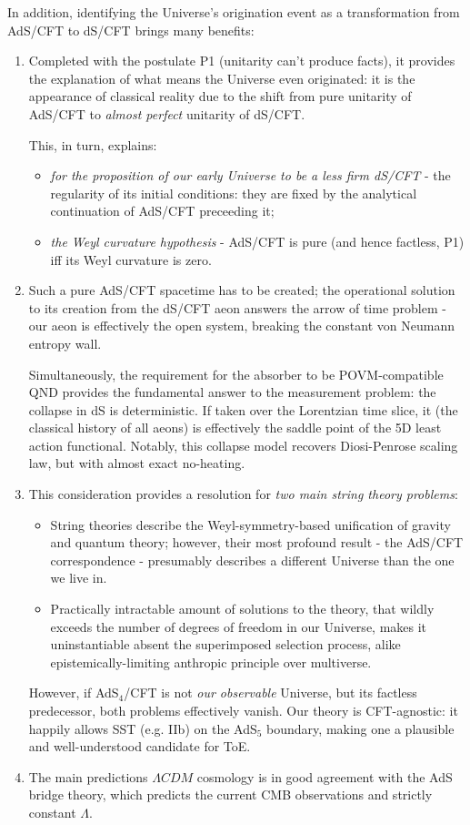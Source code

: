 \documentclass[10pt]{article}
\theoremstyle{definition}
\theoremstyle{plain}
\begin{document}
In addition, identifying the Universe's origination event as a transformation from AdS/CFT to dS/CFT brings many benefits:
\begin{enumerate}
    \item Completed with the postulate P1 (unitarity can't produce facts), it provides the explanation of what means the Universe even originated: it is the appearance of classical reality due to the shift from pure unitarity of AdS/CFT to \emph{almost perfect} unitarity of dS/CFT.

    This, in turn, explains: 
    \begin{itemize}
        \item \textit{for the proposition of our early Universe to be a less firm dS/CFT} - the regularity of its initial conditions: they are fixed by the analytical continuation of AdS/CFT preceeding it;
        \item \textit{the Weyl curvature hypothesis} - AdS/CFT is pure (and hence factless, P1) iff its Weyl curvature is zero.
    \end{itemize}
    \item Such a pure AdS/CFT spacetime has to be created; the operational solution to its creation from the dS/CFT aeon answers the arrow of time problem - our aeon is effectively the open system, breaking the constant von Neumann entropy wall. 
    
    Simultaneously, the requirement for the absorber to be POVM-compatible QND provides the fundamental answer to the measurement problem: the collapse in dS is deterministic. If taken over the Lorentzian time slice, it (the classical history of all aeons) is effectively the saddle point of the 5D least action functional. Notably, this collapse model recovers Diosi-Penrose scaling law, but with almost exact no-heating.
    \item This consideration provides a resolution for \textit{two main string theory problems}:
    \begin{itemize}
        \item String theories describe the Weyl-symmetry-based unification of gravity and quantum theory; however, their most profound result - the AdS/CFT correspondence - presumably describes a different Universe than the one we live in.
        \item Practically intractable amount of solutions to the theory, that wildly exceeds the number of degrees of freedom in our Universe, makes it uninstantiable absent the superimposed selection process, alike epistemically-limiting anthropic principle over multiverse. 
    \end{itemize}
    However, if AdS$_4$/CFT is not \emph{our observable} Universe, but its factless predecessor, both problems effectively vanish. Our theory is CFT-agnostic: it happily allows SST (e.g. IIb) on the AdS$_5$ boundary, making one a plausible and well-understood candidate for ToE.
    \item The main predictions $\Lambda CDM$ cosmology is in good agreement with the AdS bridge theory, which predicts the current CMB observations and strictly constant $\Lambda$. 


\end{enumerate}
\end{document}
